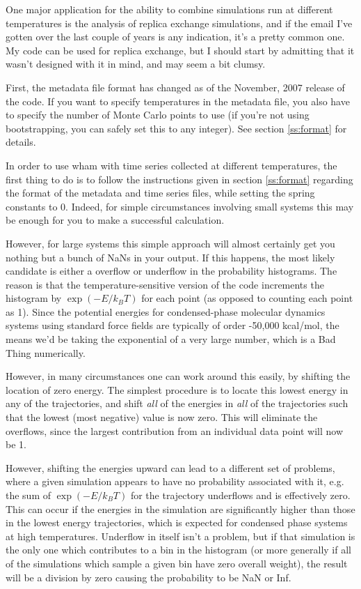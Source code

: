 \documentclass[12pt]{article}
\begin{document}
One major application for the ability to combine simulations run at different
temperatures is the analysis of replica exchange simulations, and if the
email I've gotten over the last couple of years is any indication, it's a
pretty common one.  My code can be used for replica exchange, but I should
start by admitting that it wasn't designed with it in mind, and may seem a
bit clumsy.

First, the metadata file format has changed as of the November, 2007 release
of the code.  If you want to specify temperatures in the metadata file, you
also have to specify the number of Monte Carlo points to use (if you're not
using bootstrapping, you can safely set this to any integer).  See section
\ref{ss:format} for details.

In order to use wham with time series collected at different temperatures,
the first thing to do is to follow the instructions given in section
\ref{ss:format} regarding the format of the metadata and time series files,
while setting the spring constants to 0.  Indeed, for simple circumstances
involving small systems this may be enough for you to make a successful
calculation.

However, for large systems this simple approach will almost certainly get you
nothing but a bunch of NaNs in your output.  If this happens, the most likely
candidate is either a overflow or underflow in the probability histograms.
The reason is that the temperature-sensitive version of the code increments
the histogram by $\exp(-E/k_B T)$ for each point (as opposed to counting each
point as 1).  Since the potential energies for condensed-phase
molecular dynamics systems using standard force fields are typically of order
-50,000 kcal/mol, the means we'd be taking the exponential of a very large
number, which is a Bad Thing numerically.

However, in many circumstances one can work around this easily, by shifting
the location of zero energy.  The simplest procedure is to locate this lowest
energy in any of the trajectories, and shift \emph{all} of the energies in
\emph{all} of the trajectories such that the lowest (most negative) value is
now zero.  This will eliminate the overflows, since the largest contribution
from an individual data point will now be 1.

However, shifting the energies upward can lead to a different set of
problems, where a given simulation appears to have no probability associated
with it, e.g. the sum of $\exp(-E/k_B T)$ for the trajectory underflows and
is effectively zero.  This can occur if the energies in the simulation are
significantly higher than those in the lowest energy trajectories, which is
expected for condensed phase systems at high temperatures. Underflow in
itself isn't a problem, but if that simulation is the only one which
contributes to a bin in the histogram (or more generally if all of the
simulations which sample a given bin have zero overall weight), the result
will be a division by zero causing the probability to be NaN or Inf.
\end{document}
